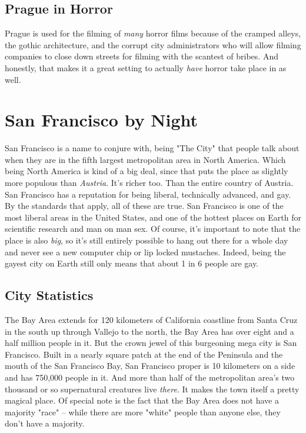 \subsection{Prague in Horror}

\hspace{\parindent} Prague is used for the filming of \textit{many} horror films because of the cramped alleys, the gothic architecture, and the corrupt city administrators who will allow filming companies to close down streets for filming with the scantest of bribes. And honestly, that makes it a great setting to actually \textit{have} horror take place in as well.

\section{San Francisco by Night}

San Francisco is a name to conjure with, being "The City" that people talk about when they are in the fifth largest metropolitan area in North America. Which being North America is kind of a big deal, since that puts the place as slightly more populous than \textit{Austria}. It's richer too. Than the entire country of Austria. San Francisco has a reputation for being liberal, technically advanced, and gay. By the standards that apply, all of these are true. San Francisco is one of the most liberal areas in the United States, and one of the hottest places on Earth for scientific research and man on man sex. Of course, it's important to note that the place is also \textit{big}, so it's still entirely possible to hang out there for a whole day and never see a new computer chip or lip locked mustaches. Indeed, being the gayest city on Earth still only means that about 1 in 6 people are gay.

\subsection{City Statistics}

\hspace{\parindent} The Bay Area extends for 120 kilometers of California coastline from Santa Cruz in the south up through Vallejo to the north, the Bay Area has over eight and a half million people in it. But the crown jewel of this burgeoning mega city is San Francisco. Built in a nearly square patch at the end of the Peninsula and the mouth of the San Francisco Bay, San Francisco proper is 10 kilometers on a side and has 750,000 people in it. And more than half of the metropolitan area's two thousand or so supernatural creatures live \textit{there}. It makes the town itself a pretty magical place. Of special note is the fact that the Bay Area does not have a majority "race" -- while there are more "white" people than anyone else, they don't have a majority.

